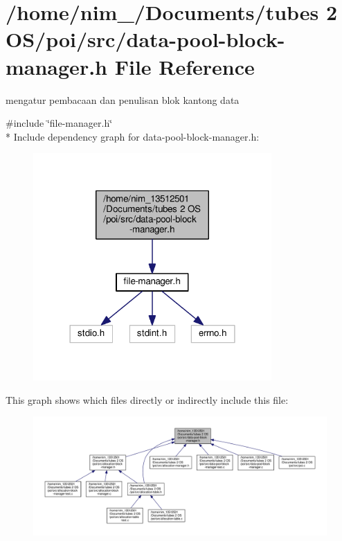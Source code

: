 \hypertarget{data-pool-block-manager_8h}{\section{/home/nim\-\_/\-Documents/tubes 2 O\-S/poi/src/data-\/pool-\/block-\/manager.h File Reference}
\label{data-pool-block-manager_8h}
}


mengatur pembacaan dan penulisan blok kantong data  


{\ttfamily \#include \char`\"{}file-\/manager.\-h\char`\"{}}\\*
Include dependency graph for data-\/pool-\/block-\/manager.h\-:\nopagebreak
\begin{figure}[H]
\begin{center}
\leavevmode
\includegraphics[width=258pt]{data-pool-block-manager_8h__incl}
\end{center}
\end{figure}
This graph shows which files directly or indirectly include this file\-:\nopagebreak
\begin{figure}[H]
\begin{center}
\leavevmode
\includegraphics[width=350pt]{data-pool-block-manager_8h__dep__incl}
\end{center}
\end{figure}
